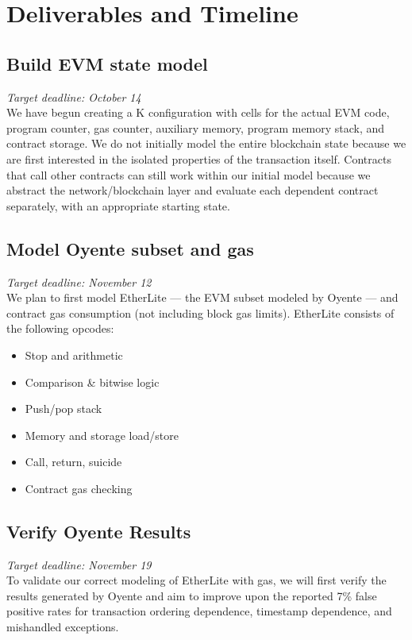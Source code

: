 \section{Deliverables and Timeline}

\subsection{Build EVM state model}
\noindent\emph{Target deadline: October 14}\\[6pt]
We have begun creating a K configuration with cells for the actual EVM code, program counter, gas counter, auxiliary memory, program memory stack, and contract storage.
We do not initially model the entire blockchain state because we are first interested in the isolated properties of the transaction itself. 
Contracts that call other contracts can still work within our initial model because we abstract the network/blockchain layer and evaluate each dependent contract separately, with an appropriate starting state. 

\subsection{Model Oyente subset and gas}
\noindent\emph{Target deadline: November 12}\\[6pt]
We plan to first model EtherLite --- the EVM subset modeled by Oyente --- and contract gas consumption (not including block gas limits).
EtherLite consists of the following opcodes: 
\begin{itemize}
	\renewcommand\labelitemi{--}
	\itemsep0.2em
	\item Stop and arithmetic
	\item Comparison \& bitwise logic
	\item Push/pop stack
	\item Memory and storage load/store
	\item Call, return, suicide
	\item Contract gas checking
\end{itemize}

\subsection{Verify Oyente Results}
\noindent\emph{Target deadline: November 19}\\[6pt]
To validate our correct modeling of EtherLite with gas, we will first verify the results generated by Oyente and aim to improve upon the reported 7\% false positive rates for transaction ordering dependence, timestamp dependence, and mishandled exceptions.

